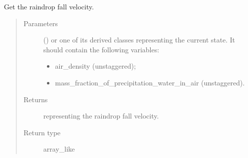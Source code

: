 \documentclass[letterpaper,10pt,english]{sphinxmanual}
\begin{document}
\begin{fulllineitems}
\begin{fulllineitems}
\begin{quote}
\begin{description}
\begin{itemize}
\end{itemize}

\end{description}\end{quote}

\end{fulllineitems}


\begin{fulllineitems}
\label{\detokenize{api:parameterizations.adjustment_microphysics.AdjustmentMicrophysics.get_raindrop_fall_velocity}}
Get the raindrop fall velocity.
\begin{quote}\begin{description}
\item[{Parameters}] \leavevmode
{} () \textendash{} 
{\hyperref[\detokenize{api:storages.grid_data.GridData}]{}} or one of its derived classes representing the current state.
It should contain the following variables:
\begin{itemize}
\item {} 
air\_density (unstaggered);

\item {} 
mass\_fraction\_of\_precipitation\_water\_in\_air (unstaggered).

\end{itemize}


\item[{Returns}] \leavevmode
{} representing the raindrop fall velocity.

\item[{Return type}] \leavevmode
array\_like

\end{description}\end{quote}

\end{fulllineitems}


\end{fulllineitems}

\end{document}
